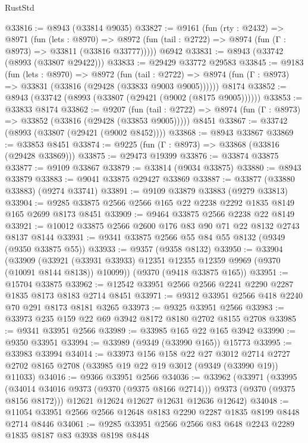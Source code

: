 \begin{lexlean}{RustStd}
\begin{coremodule}
{\begin{coremodule}
{{{{{{{{{{{{{{{{{{{{{{{{{{{{{{{{{{{{{{{@33816 := @8943 (@33814 @9035)
@33827 := @9161
    (fun (rty : @2432) =>
    @8971
      (fun (lets : @8970) =>
      @8972 (fun (tail : @2722) => @8974 (fun (Γ : @8973) => @33811 (@33816 @33777)))))
    @6942
@33831 := @8943 (@33742 (@8993 (@33807 @29422)))
@33833 := @29429 @33772 @29583
@33845 := @9183
    (fun (lets : @8970) =>
    @8972
      (fun (tail : @2722) =>
      @8974 (fun (Γ : @8973) => @33831 (@33816 (@29428 (@33833 @9003 @9005))))))
    @8174
@33852 := @8943 (@33742 (@8993 (@33807 (@29421 (@9002 (@8175 @9005))))))
@33853 := @33833 @8174
@33862 := @9207
    (fun (tail : @2722) => @8974 (fun (Γ : @8973) => @33852 (@33816 (@29428 (@33853 @9005)))))
    @8451
@33867 := @33742 (@8993 (@33807 (@29421 (@9002 @8452))))
@33868 := @8943 @33867
@33869 := @33853 @8451
@33874 := @9225 (fun (Γ : @8973) => @33868 (@33816 (@29428 @33869)))
@33875 := @29473 @19399
@33876 := @33874 @33875
@33877 := @9109 @33867
@33879 := @33814 (@9034 @33875)
@33880 := @8943 @33879
@33883 := @9041 @33875 @29427 @33869
@33887 := @33877 (@33880 @33883) (@9274 @33741)
@33891 := @9109 @33879 @33883 (@9279 @33813)
@33904 := @9285 @33875 @2566 @2566 @165 @22 @2238 @2292 @1835 @8149 @165 @2699 @8173 @8451
@33909 := @9464 @33875 @2566 @2238 @22 @8149
@33921 := @10012 @33875 @2566 @2600 @176 @83 @90 @71 @22 @8132 @2743 @8137 @8144
@33931 := @9341 @33875 @2566 @55 @84 @55 @8132 (@9349 (@9350 @33875 @55))
@33933 := @9357 (@9358 @8132)
@33950 := @33904
    (@33909 (@33921 (@33931 @33933) @12351 @12355 @12359 @9969 (@9370 (@10091 @8144 @8138)) @10099))
    (@9370 (@9418 @33875 @165))
@33951 := @15704 @33875
@33962 := @12542 @33951 @2566 @2566 @2241 @2290 @2287 @1835 @8173 @8183 @2714 @8451
@33971 := @9312 @33951 @2566 @418 @2240 @70 @291 @8173 @8181 @3265
@33973 := @9325 @33951 @2566
@33983 := @33973 @235 @159 @22 @69 @3942 @8172 @8180 @2702 @8155 @2708
@33985 := @9341 @33951 @2566
@33989 := @33985 @165 @22 @165 @3942
@33990 := @9350 @33951
@33994 := @33989 (@9349 (@33990 @165)) @15773
@33995 := @33983 @33994
@34014 := @33973
    @156
    @158
    @22
    @27
    @3012
    @2714
    @2727
    @2702
    @8165
    @2708
    (@33985 @19 @22 @19 @3012 (@9349 (@33990 @19)) @11033)
@34016 := @9366 @33951 @2566
@34036 := @33962
    (@33971
      (@33995 (@34014 @34016 @9373 (@9370 (@9375 @8166 @2714))) @9373 (@9370 (@9375 @8156 @8172)))
      @12621
      @12624
      @12627
      @12631
      @12636
      @12642)
@34048 := @11054 @33951 @2566 @2566 @12648 @8183 @2290 @2287 @1835 @8199 @8448 @2714 @8446
@34061 := @9285 @33951 @2566 @2566 @83 @648 @2243 @2289 @1835 @8187 @83 @3938 @8198 @8448
}}}}}}}}}}}}}}}}}}}}}}}}}}}}}}}}}}}}}}}
\end{coremodule}}
\end{coremodule}
\end{lexlean}

